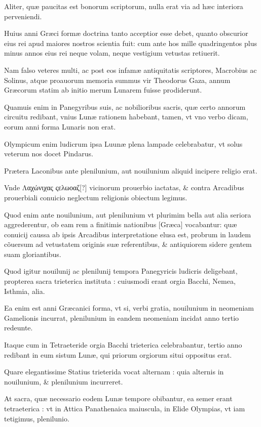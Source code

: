 \begin{parnumbers}
Aliter, quæ paucitas est bonorum scriptorum, nulla erat via ad hæc interiora perveniendi.

Huius anni Græci formæ doctrina tanto acceptior esse debet, quanto obscurior eius rei apud maiores nostros scientia fuit: cum ante hos mille quadringentos plus minus annos eius rei neque volam, neque vestigium vetustas retiuerit.

Nam falso veteres multi, ac post eos infamæ 
antiquitatis scriptores, Macrobius ac Solinus, atque proauorum memoria summus vir Theodorus Gaza, annum Græcorum statim ab initio merum Lunarem fuisse prodiderunt.

Quamuis enim in Panegyribus suis, ac nobilioribus sacris, quæ certo annorum circuitu redibant, vnius Lunæ rationem habebant, tamen, vt vno verbo dicam, eorum anni forma Lunaris non erat.

Olympicum enim ludicrum ipsa Luunæ plena lampade celebrabatur, vt solus veterum nos docet Pindarus. 

Prætera Laconibus ante plenilunium, aut nouilunium aliquid incipere religio erat.

Vnde \textgreek{Λαχώνιχας ςελωοαζ}[?] vicinorum prouerbio iactatas, \& contra Arcadibus prouerbiali conuicio neglectum religionis obiectum legimus. 

Quod enim ante nouilunium, aut plenilunium vt plurimim bella aut alia seriora aggrederentur, ob eam rem a finitimis nationibus [Græca] vocabantur: quæ conuicij caussa ab ipsis Arcadibus interpretatione elusa est, probrum in laudem cõuersum ad vetustatem originis suæ referentibus, \& antiquiorem sidere gentem suam gloriantibus. 

Quod igitur nouilunij ac plenilunij tempora Panegyricis ludicris deligebant, propterea sacra trieterica instituta : cuiusmodi erant orgia Bacchi, Nemea, Isthmia, alia.

Ea enim est anni Græcanici forma, vt si, verbi gratia, nouilunium in neomeniam Gamelionis incurrat, plenilunium in eandem neomeniam incidat anno tertio redeunte.

Itaque cum in Tetraeteride orgia Bacchi trieterica celebrabantur, tertio anno redibant in eum sistum Lunæ, qui priorum orgiorum situi oppositus erat.

Quare elegantissime Statius trieterida vocat alternam : quia alternis in nouilunium, \& plenilunium incurreret.

At sacra, quæ necessario eodem Lunæ tempore obibantur, ea semer erant tetraeterica : vt in Attica Panathenaica maiuscula, in Elide Olympias, vt iam tetigimus, plenilunio.


\end{parnumbers}
